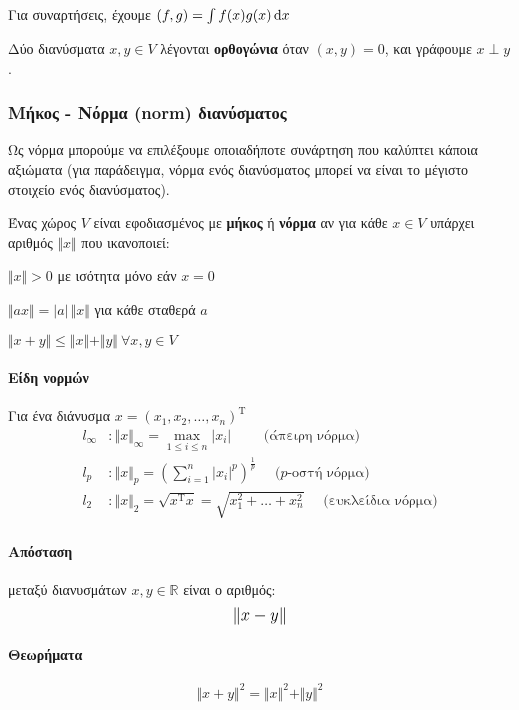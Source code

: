 \documentclass[11pt,a4paper,notitlepage,fleqn,final]{article}
\begin{document}
	Για συναρτήσεις, έχουμε \( (f,g) = \int f(x)g(x)\mathop{}\!\mathrm{d} x \)

	Δύο διανύσματα \( x,y \in V \) λέγονται \textbf{ορθογώνια} όταν
	\( (x,y) = 0\), και γράφουμε \( x \perp y \).

	\subsubsection{Μήκος - Νόρμα (norm) διανύσματος}
	Ως νόρμα μπορούμε να επιλέξουμε οποιαδήποτε συνάρτηση που καλύπτει
	κάποια αξιώματα (για παράδειγμα, νόρμα ενός διανύσματος μπορεί να
	είναι το μέγιστο στοιχείο ενός διανύσματος).

	Ένας χώρος \( V \) είναι εφοδιασμένος με \textbf{μήκος} ή
	\textbf{νόρμα} αν για κάθε \( x \in V \) υπάρχει αριθμός
	\( \Vert x\Vert \) που ικανοποιεί:

	\begin{enumroman}
		\item \( \Vert x\Vert > 0 \) με ισότητα μόνο εάν \( x=0 \)
		\item \( \Vert ax\Vert = |a|\,\Vert x\Vert \) για κάθε σταθερά \( a \)
		\item \( \Vert x+y\Vert \leq \Vert x\Vert+\Vert y\Vert \ \forall x,y\in V  \)
	\end{enumroman}

	\paragraph{Είδη νορμών}
	Για ένα διάνυσμα \( x=(x_1,x_2,\dots,x_n)^{\mathrm T} \)
	\begin{align*}
		l_{\infty} &: \Vert x\Vert _{\infty} = \max_{1\leq i \leq n}|x_i|
		\qquad \text{ (άπειρη νόρμα)}
		\\
		l_p &: \Vert x\Vert _{p} =
		\left(\sum_{i=1}^n |x_i|^p\right)^{\frac{1}{p}}
		\quad \text{ ($p$-οστή νόρμα)}
		\\
		l_2 &: \Vert x\Vert _2 = \sqrt{x^{\mathrm T}x} =
		\sqrt{x_1^2 + \dots + x_n^2}
		\quad \text{ (ευκλείδια νόρμα)}
	\end{align*}

	\paragraph{Απόσταση}
	μεταξύ διανυσμάτων \( x,y \in \mathbb R  \) είναι ο αριθμός:
	\[
    \mathlarger{\Vert x-y\Vert }
	\]

	\paragraph{Θεωρήματα}
	\[
	\Vert x+y\Vert ^2 = \Vert x\Vert ^2 + \Vert y\Vert ^2
	\]
\end{document}
